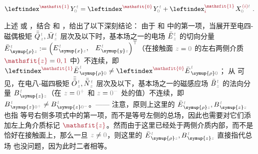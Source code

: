 \begin{align}
	\leftindex^{\textcolor{Maroon}{\mathsfit{1}}} \;\! Y^{\;\!\mathcolor{gray}{t}}_{\mathcolor{gray}{0}} = \leftindex^{\textcolor{Maroon}{\mathsfit{0}}} \;\! Y^{\;\!\mathcolor{gray}{t}}_{\mathcolor{gray}{0}} + \leftindex^{\textcolor{Maroon}{\mathsfit{1}}}_{\textcolor{Maroon}{i}} \;\! X^{\;\!\textcolor{Maroon}{(i)}\mathcolor{gray}{t}}_{\mathcolor{gray}{0}} ~. \label{eq:1BC}
\end{align}

上述  或 ，结合  和 ，给出了以下深刻结论：{\one} 由于  和  中的第一项，当展开至电四-磁偶极矩 $\bar{\bar{Q}}^{\;\!\mathcolor{gray}{t}}_{\;\!\mathcolor{gray}{z}}, \bar{M}^{\;\!\mathcolor{gray}{t}}_{\;\!\mathcolor{gray}{z}}$ 层次及以下时，基本场之一的电场 $\bar{E}^{\;\!\mathcolor{gray}{t}}_{\;\!\mathcolor{gray}{z}}$ 的切向分量 $\bar{E}^{\;\!\mathcolor{gray}{t}}_{\;\! \symup{\rho} \mathcolor{gray}{z}} := \begin{pmatrix} E^{\;\!\mathcolor{gray}{t}}_{\;\! \symup{x} \mathcolor{gray}{z}}, & E^{\;\!\mathcolor{gray}{t}}_{\;\! \symup{y} \mathcolor{gray}{z}} \end{pmatrix}^\top$（在接触面 $\mathcolor{gray}{z \mathcolor{black}{=} 0}$ 的左右两侧介质 $\textcolor{Maroon}{\mathsfit{z}} = \textcolor{Maroon}{0,1}$ 中）不连续，即 $\leftindex^{\textcolor{Maroon}{\mathsfit{1}}} {\bar{E}}^{\;\!\mathcolor{gray}{t}}_{\;\! \symup{\rho} \mathcolor{gray}{0}} \neq \leftindex^{\textcolor{Maroon}{\mathsfit{0}}} {\bar{E}}^{\;\!\mathcolor{gray}{t}}_{\;\! \symup{\rho} \mathcolor{gray}{0}}$；{\two} 从  可见，在电八-磁四极矩 $\bar{\bar{\bar{O}}}^{\;\!\mathcolor{gray}{t}}_{\;\!\mathcolor{gray}{z}}, \bar{\bar{N}}^{\;\!\mathcolor{gray}{t}}_{\;\!\mathcolor{gray}{z}}$ 层次及以下，基本场之一的磁感应场 $\bar{B}^{\;\!\mathcolor{gray}{t}}_{\;\!\mathcolor{gray}{z}}$ 的法向分量 $B^{\;\!\mathcolor{gray}{t}}_{\;\! \symup{z} \mathcolor{gray}{z}}$（在 $\mathcolor{gray}{z \mathcolor{black}{=} 0^+}$ 和 $\mathcolor{gray}{z \mathcolor{black}{=} 0^-}$ 处的值）不连续，即 $B^{\;\!\mathcolor{gray}{t}}_{\;\! \symup{z} \mathcolor{gray}{0^+}} \neq B^{\;\!\mathcolor{gray}{t}}_{\;\! \symup{z} \mathcolor{gray}{0^-}}$。—— 注意，原则上这里的 $\bar{E}^{\;\!\mathcolor{gray}{t}}_{\;\! \symup{\rho} \mathcolor{gray}{z}},B^{\;\!\mathcolor{gray}{t}}_{\;\! \symup{z} \mathcolor{gray}{z}}$ 也指  等号右侧多项式中的第一项，而不是等号左侧的总场，因此也需要对它们添加左上角介质标记 $\textcolor{Maroon}{\mathsfit{z}}$。然而由于这里已经处于两侧介质内部，而不是恰好在接触面上，那么一旦 $\mathcolor{gray}{z} \neq \mathcolor{gray}{0}$，则这里的 $\bar{E}^{\;\!\mathcolor{gray}{t}}_{\;\! \symup{\rho} \mathcolor{gray}{z}},B^{\;\!\mathcolor{gray}{t}}_{\;\! \symup{z} \mathcolor{gray}{z}}$ 直接指代总场  也没问题，因为此时二者相等。

